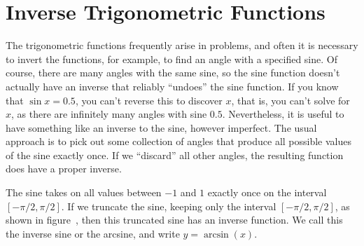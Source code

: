 \section{Inverse Trigonometric Functions}{}{}
\nobreak
The trigonometric functions frequently arise in problems, and often it
is necessary to invert the functions, for example, to find an angle with
a specified sine. Of course, there are many angles with the same sine,
so the sine function doesn't actually have an inverse that reliably
``undoes'' the sine function. If you know that $\sin x=0.5$, you can't
reverse this to discover $x$, that is, you can't solve for
$x$, as there are infinitely many angles with sine
$0.5$. Nevertheless, it is useful to have something like an inverse to
the sine, however imperfect. The usual approach is to pick out some
collection of angles that produce all possible values of the sine
exactly once. If we ``discard'' all other angles, the resulting
function does have a proper inverse.

The sine takes on all values between $-1$ and $1$ exactly once on the
interval $[-\pi/2,\pi/2]$. If we truncate the sine, keeping only the
interval $[-\pi/2,\pi/2]$, as shown in figure~, then this truncated sine has an inverse function. We call this
the inverse sine or the arcsine, and
write $y=\arcsin(x)$.

